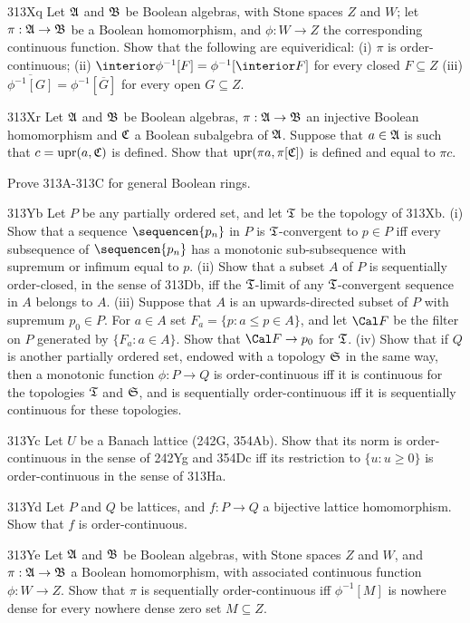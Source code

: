 {\spheader 313Xq Let $\frak A$ and $\frak B$ be Boolean algebras,
with Stone spaces $Z$ and $W$;  let $\pi:\frak A\to\frak B$ be a Boolean
homomorphism, and $\phi:W\to Z$ the corresponding continuous function.
Show that the following are equiveridical:  (i)
$\pi$ is order-continuous;
(ii) $\interior\phi^{-1}[F]=\phi^{-1}[\interior F]$ for every closed
$F\subseteq Z$ (iii) $\overline{\phi^{-1}[G]}=\phi^{-1}[\overline{G}]$
for every open $G\subseteq Z$.

\spheader 313Xr Let $\frak A$ and $\frak B$ be Boolean algebras,
$\pi:\frak A\to\frak B$ an injective
Boolean homomorphism and $\frak C$ a Boolean
subalgebra of $\frak A$.   Suppose that $a\in\frak A$ is such that
$c=\mathop{\text{upr}}(a,\frak C)$ is defined.   Show that
$\mathop{\text{upr}}(\pi a,\pi[\frak C])$ is defined and equal to $\pi c$.

 Prove 313A-313C for general Boolean
rings.

\spheader 313Yb Let $P$ be any partially ordered set, and let
$\frak T$ be the topology of 313Xb.  (i) Show that a sequence
$\sequencen{p_n}$ in $P$ is $\frak T$-convergent to $p\in P$ iff every
subsequence of $\sequencen{p_n}$ has a monotonic sub-subsequence with
supremum or infimum equal to $p$.   (ii) Show that a subset $A$ of $P$
is sequentially order-closed, in the sense of 313Db, iff the
$\frak T$-limit of any $\frak T$-convergent sequence in $A$ belongs to
$A$.   (iii) Suppose that $A$ is an upwards-directed subset of $P$ with
supremum $p_0\in P$.   For $a\in A$ set $F_a=\{p:a\le p\in A\}$, and let
$\Cal F$ be the filter on $P$ generated by $\{F_a:a\in A\}$.   Show that
$\Cal F\to p_0$ for $\frak T$.   (iv) Show that if $Q$ is another
partially ordered set, endowed with a topology $\frak S$ in the same
way, then a monotonic function $\phi:P\to Q$ is order-continuous iff it
is continuous for the topologies $\frak T$ and $\frak S$, and is
sequentially order-continuous iff it is sequentially continuous for
these topologies.

\spheader 313Yc Let $U$ be a Banach lattice (242G, 354Ab).   Show that
its norm is order-continuous in the sense of 242Yg and 354Dc iff its
restriction to
$\{u:u\ge 0\}$ is order-continuous in the sense of 313Ha.

\spheader 313Yd Let $P$ and $Q$ be lattices, and $f:P\to Q$ a
bijective lattice homomorphism.   Show that $f$ is order-continuous.

\spheader 313Ye Let $\frak A$ and $\frak B$ be Boolean algebras,
with Stone spaces $Z$ and $W$, and $\pi:\frak A\to\frak B$ a Boolean
homomorphism, with associated continuous function $\phi:W\to Z$.   Show
that $\pi$ is sequentially order-continuous iff $\phi^{-1}[M]$ is
nowhere dense for every nowhere dense zero set $M\subseteq Z$.

}
